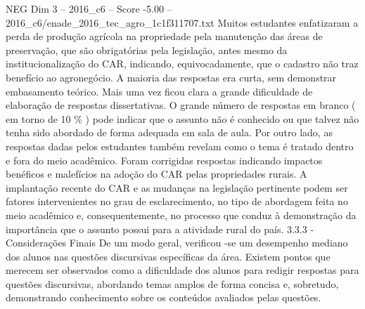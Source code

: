 \begin{textsample}{NEG Dim 3 – 2016\_c6 – Score -5.00 – 2016\_c6/enade\_2016\_tec\_agro\_1c1f311707.txt}
Muitos estudantes enfatizaram a perda de produção agrícola na propriedade pela manutenção das áreas de preservação, que são obrigatórias pela legislação, antes mesmo da institucionalização do CAR, indicando, equivocadamente, que o cadastro não traz benefício ao agronegócio.
A maioria das respostas era curta, sem demonstrar embasamento teórico.
Mais uma vez ficou clara a grande dificuldade de elaboração de respostas dissertativas.
O grande número de respostas em branco ( em torno de 10 \% ) pode indicar que o assunto não é conhecido ou que talvez não tenha sido abordado de forma adequada em sala de aula.
Por outro lado, as respostas dadas pelos estudantes também revelam como o tema é tratado dentro e fora do meio acadêmico.
Foram corrigidas respostas indicando impactos benéficos e malefícios na adoção do CAR pelas propriedades rurais.
A implantação recente do CAR e as mudanças na legislação pertinente podem ser fatores intervenientes no grau de esclarecimento, no tipo de abordagem feita no meio acadêmico e, consequentemente, no processo que conduz à demonstração da importância que o assunto possui para a atividade rural do país. 3.3.3 - Considerações Finais De um modo geral, verificou -se um desempenho mediano dos alunos nas questões discursivas específicas da área.
Existem pontos que merecem ser observados como a dificuldade dos alunos para redigir respostas para questões discursivas, abordando temas amplos de forma concisa e, sobretudo, demonstrando conhecimento sobre os conteúdos avaliados pelas questões.

\end{textsample}

